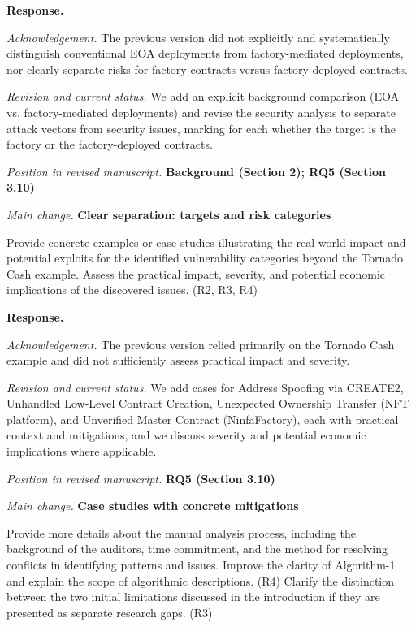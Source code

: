 \documentclass[acmsmall]{acmart}
\begin{document}
	\noindent
	\textbf{Response.}

	\textit{Acknowledgement.} The previous version did not explicitly and systematically distinguish
	conventional EOA deployments from factory-mediated deployments, nor clearly separate risks for factory
	contracts versus factory-deployed contracts.

	\textit{Revision and current status.} We add an explicit background comparison (EOA vs. factory-mediated
	deployments) and revise the security analysis to separate attack vectors from security issues,
	marking for each whether the target is the factory or the factory-deployed contracts.

	\vspace{0.25em}
	\textit{Position in revised manuscript.} {\color{red}\textbf{Background (Section 2); RQ5 (Section 3.10)}}

	\textit{Main change.} {\color{blue}\textbf{Clear separation: targets and risk categories}}

	\begin{tcolorbox}
		[commentbox,title=Editor/AE -- Comment 4] Provide concrete examples or case studies
		illustrating the real-world impact and potential exploits for the identified vulnerability
		categories beyond the Tornado Cash example. Assess the practical impact, severity, and potential
		economic implications of the discovered issues. (R2, R3, R4)
	\end{tcolorbox}

	\noindent
	\textbf{Response.}

	\textit{Acknowledgement.} The previous version relied primarily on the Tornado Cash example and
	did not sufficiently assess practical impact and severity.

	\textit{Revision and current status.} We add cases for Address Spoofing via CREATE2, Unhandled
	Low-Level Contract Creation, Unexpected Ownership Transfer (NFT platform), and Unverified Master
	Contract (NinfaFactory), each with practical context and mitigations, and we discuss severity
	and potential economic implications where applicable.

	\vspace{0.25em}
	\textit{Position in revised manuscript.} {\color{red}\textbf{RQ5 (Section 3.10)}}

	\textit{Main change.} {\color{blue}\textbf{Case studies with concrete mitigations}}

	\begin{tcolorbox}
		[commentbox,title=Editor/AE -- Comment 5] Provide more details about the manual analysis
		process, including the background of the auditors, time commitment, and the method for resolving
		conflicts in identifying patterns and issues. Improve the clarity of Algorithm-1 and explain
		the scope of algorithmic descriptions. (R4) Clarify the distinction between the two initial limitations
		discussed in the introduction if they are presented as separate research gaps. (R3)
	\end{tcolorbox}
\end{document}
